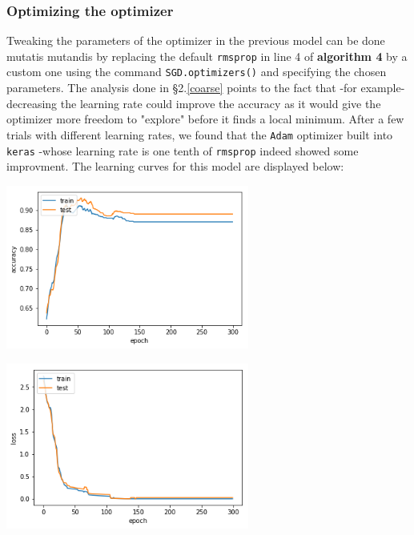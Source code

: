 \documentclass[14pt]{article}
\theoremstyle{plain}
\theoremstyle{definition}
\begin{document}
\subsubsection{Optimizing the optimizer}
Tweaking the parameters of the optimizer in the previous model can be done mutatis mutandis by replacing the default \texttt{rmsprop}  in line 4 of {\bf algorithm 4} by a custom one using the command \texttt{SGD.optimizers()} and specifying the chosen parameters. The analysis done in \S 2.\ref{coarse} points to the fact that -for example- decreasing the learning rate could improve the accuracy as it would give the optimizer more freedom to "explore" before it finds a local minimum. After a few trials with different learning rates, we found that the \texttt{Adam} optimizer built into \texttt{keras} -whose learning rate is one tenth of \texttt{rmsprop} indeed showed some improvment. The learning curves for this model are displayed below:  
 \begin{table}[ht]
\begin{minipage}[b]{0.3\linewidth}
\centering
\includegraphics[width=80mm]{banknote_forgery_files/adam_model_1}
\end{minipage}\hfill
\begin{minipage}[b]{0.5\linewidth}
\centering
\includegraphics[width=80mm]{banknote_forgery_files/adam_model_2}
\end{minipage}
\end{table}
\end{document}
